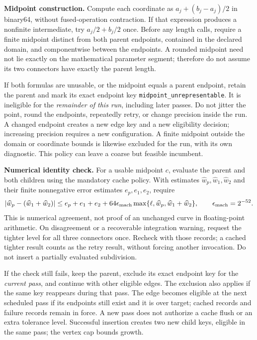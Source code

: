 \documentclass[11pt,letterpaper]{article}
\newcommand{\src}[1]{\nolinkurl{#1}}
\begin{document}
\textbf{Midpoint construction.} Compute each coordinate as $a_j+(b_j-a_j)/2$ in binary64, without fused-operation contraction. If that expression produces a nonfinite intermediate, try $a_j/2+b_j/2$ once. Before any length calls, require a finite midpoint distinct from both parent endpoints, contained in the declared domain, and componentwise between the endpoints. A rounded midpoint need not lie exactly on the mathematical parameter segment; therefore do not assume its two connectors have exactly the parent length.

If both formulas are unusable, or the midpoint equals a parent endpoint, retain the parent and mark its exact endpoint key \src{midpoint_unrepresentable}. It is ineligible for the \emph{remainder of this run}, including later passes. Do not jitter the point, round the endpoints, repeatedly retry, or change precision inside the run. A changed endpoint creates a new edge key and a new eligibility decision; increasing precision requires a new configuration. A finite midpoint outside the domain or coordinate bounds is likewise excluded for the run, with its own diagnostic. This policy can leave a coarse but feasible incumbent.

\textbf{Numerical identity check.} For a usable midpoint $c$, evaluate the parent and both children using the mandatory cache policy. With estimates $\widehat w_p,\widehat w_1,\widehat w_2$ and their finite nonnegative error estimates $e_p,e_1,e_2$, require
\[
 |\widehat w_p-(\widehat w_1+\widehat w_2)|
 \le e_p+e_1+e_2+
 64\epsilon_{\rm mach}\max\{\ell,\widehat w_p,\widehat w_1+\widehat w_2\},
 \qquad \epsilon_{\rm mach}=2^{-52}.
\]
This is numerical agreement, not proof of an unchanged curve in floating-point arithmetic. On disagreement or a recoverable integration warning, request the tighter level for all three connectors once. Recheck with those records; a cached tighter result counts as the retry result, without forcing another invocation. Do not insert a partially evaluated subdivision.

If the check still fails, keep the parent, exclude its exact endpoint key for the \emph{current pass}, and continue with other eligible edges. The exclusion also applies if the same key reappears during that pass. The edge becomes eligible at the next scheduled pass if its endpoints still exist and it is over target; cached records and failure records remain in force. A new pass does not authorize a cache flush or an extra tolerance level. Successful insertion creates two new child keys, eligible in the same pass; the vertex cap bounds growth.
\end{document}
